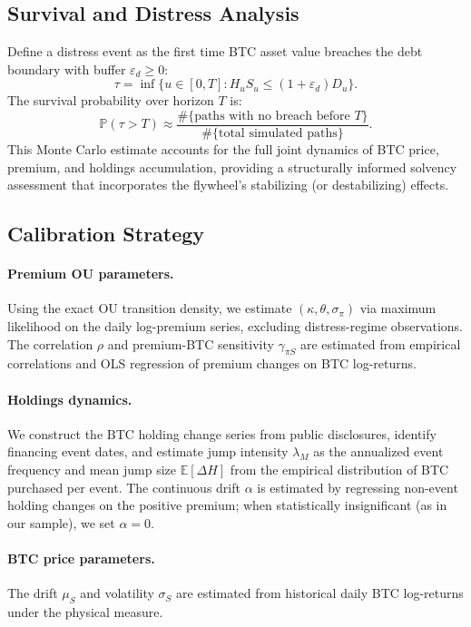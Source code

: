\subsection{Survival and Distress Analysis}

Define a distress event as the first time BTC asset value breaches the debt boundary with buffer $\varepsilon_d \ge 0$:
\begin{equation}
    \tau = \inf\{u \in [0,T] : H_u S_u \le (1+\varepsilon_d) D_u\}.
\end{equation}
The survival probability over horizon $T$ is:
\begin{equation}
    \mathbb{P}(\tau > T) \approx \frac{\#\{\text{paths with no breach before } T\}}{\#\{\text{total simulated paths}\}}.
\end{equation}
This Monte Carlo estimate accounts for the full joint dynamics of BTC price, premium, and holdings accumulation, providing a structurally informed solvency assessment that incorporates the flywheel's stabilizing (or destabilizing) effects.

\subsection{Calibration Strategy}

\paragraph{Premium OU parameters.} Using the exact OU transition density, we estimate $(\kappa, \theta, \sigma_\pi)$ via maximum likelihood on the daily log-premium series, excluding distress-regime observations. The correlation $\rho$ and premium-BTC sensitivity $\gamma_{\pi S}$ are estimated from empirical correlations and OLS regression of premium changes on BTC log-returns.

\paragraph{Holdings dynamics.} We construct the BTC holding change series from public disclosures, identify financing event dates, and estimate jump intensity $\lambda_M$ as the annualized event frequency and mean jump size $\mathbb{E}[\Delta H]$ from the empirical distribution of BTC purchased per event. The continuous drift $\alpha$ is estimated by regressing non-event holding changes on the positive premium; when statistically insignificant (as in our sample), we set $\alpha = 0$.

\paragraph{BTC price parameters.} The drift $\mu_S$ and volatility $\sigma_S$ are estimated from historical daily BTC log-returns under the physical measure.
